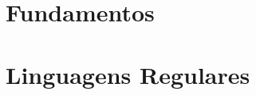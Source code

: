 \documentclass[10pt, a4paper]{book}
\begin{document}
\frontmatter




\tableofcontents

\mainmatter

\part{Fundamentos}


\part{Linguagens Regulares}


{}	%
\end{document}
